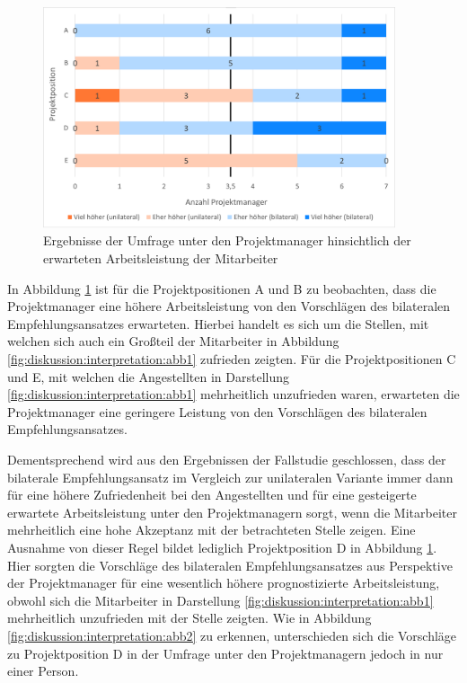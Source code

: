 \begin{figure}[h]
	\centering
	\includegraphics[width=0.925\textwidth]{gfx/ergebnisse-projektmanager-arbeitsleistung.png}	
	\caption{Ergebnisse der Umfrage unter den Projektmanager hinsichtlich der erwarteten Arbeitsleistung der Mitarbeiter}
	\label{fig:diskussion:interpretation:abb4}
\end{figure}

In Abbildung \ref{fig:diskussion:interpretation:abb4} ist für die Projektpositionen A und B zu beobachten, dass die Projektmanager eine höhere Arbeitsleistung von den Vorschlägen des bilateralen Empfehlungsansatzes erwarteten. Hierbei handelt es sich um die Stellen, mit welchen sich auch ein Großteil der Mitarbeiter in Abbildung \ref{fig:diskussion:interpretation:abb1} zufrieden zeigten. Für die Projektpositionen C und E, mit welchen die Angestellten in Darstellung \ref{fig:diskussion:interpretation:abb1} mehrheitlich unzufrieden waren, erwarteten die Projektmanager eine geringere Leistung von den Vorschlägen des bilateralen Empfehlungsansatzes.

Dementsprechend wird aus den Ergebnissen der Fallstudie geschlossen, dass der bilaterale Empfehlungsansatz im Vergleich zur unilateralen Variante immer dann für eine höhere Zufriedenheit bei den Angestellten und für eine gesteigerte erwartete Arbeitsleistung unter den Projektmanagern sorgt, wenn die Mitarbeiter mehrheitlich eine hohe Akzeptanz mit der betrachteten Stelle zeigen. Eine Ausnahme von dieser Regel bildet lediglich Projektposition D in Abbildung \ref{fig:diskussion:interpretation:abb4}. Hier sorgten die Vorschläge des bilateralen Empfehlungsansatzes aus Perspektive der Projektmanager für eine wesentlich höhere prognostizierte Arbeitsleistung, obwohl sich die Mitarbeiter in Darstellung \ref{fig:diskussion:interpretation:abb1} mehrheitlich unzufrieden mit der Stelle zeigten. Wie in Abbildung \ref{fig:diskussion:interpretation:abb2} zu erkennen, unterschieden sich die Vorschläge zu Projektposition D in der Umfrage unter den Projektmanagern jedoch in nur einer Person.

